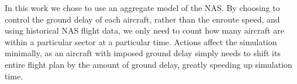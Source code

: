 \documentclass{aamas2014}
\begin{document}

In this work we chose to use an aggregate model of the NAS. By choosing to control the ground delay of each aircraft, rather than the enroute speed, and using historical NAS flight data, we only need to count how many aircraft are within a particular sector at a particular time. Actions affect the simulation minimally, as an aircraft with imposed ground delay simply needs to shift its entire flight plan by the amount of ground delay, greatly speeding up simulation time.


\end{document}
